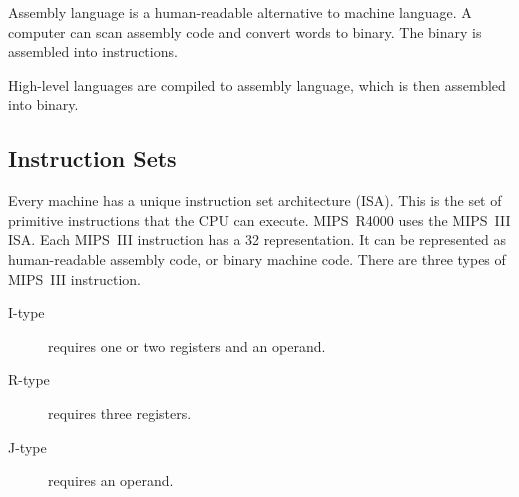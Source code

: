 Assembly language is a human-readable alternative to machine language.
A computer can scan assembly code and convert words to binary.
The binary is assembled into instructions.

High-level languages are compiled to assembly language, which is then assembled into binary.

\subsection{Instruction Sets}

Every machine has a unique instruction set architecture (ISA).
This is the set of primitive instructions that the CPU can execute.
MIPS~R4000 uses the MIPS~III ISA.\@
Each MIPS~III instruction has a \SI{32}{\bit} representation.
It can be represented as human-readable assembly code, or binary machine code.
There are three types of MIPS~III instruction.
\begin{description}
  \item[I-type] requires one or two registers and an operand.
  \item[R-type] requires three registers.
  \item[J-type] requires an operand.
\end{description}
